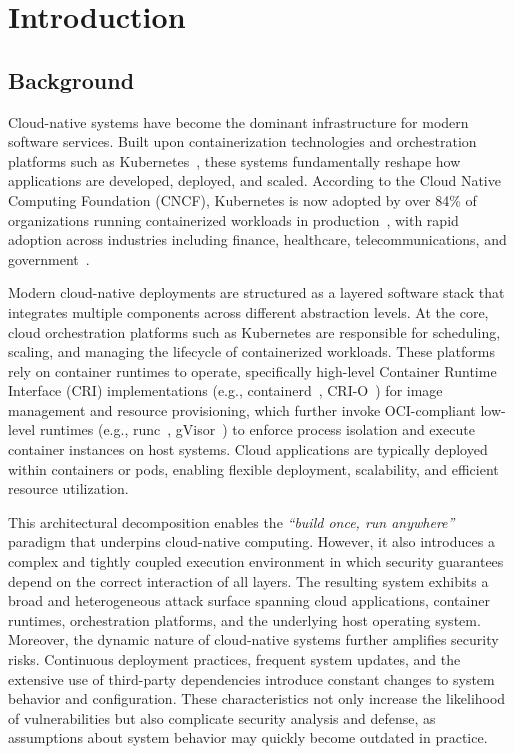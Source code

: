 \chapter{Introduction}

\section{Background}

Cloud-native systems have become the dominant infrastructure for modern software services. Built upon containerization technologies and orchestration platforms such as Kubernetes~\cite{k8s}, these systems fundamentally reshape how applications are developed, deployed, and scaled. According to the Cloud Native Computing Foundation (CNCF), Kubernetes is now adopted by over 84\% of organizations running containerized workloads in production~\cite{cncf2024kubernetes}, with rapid adoption across industries including finance, healthcare, telecommunications, and government~\cite{unyaml2024k8sstats}.

Modern cloud-native deployments are structured as a layered software stack that integrates multiple components across different abstraction levels. At the core, cloud orchestration platforms such as Kubernetes are responsible for scheduling, scaling, and managing the lifecycle of containerized workloads. These platforms rely on container runtimes to operate, specifically high-level Container Runtime Interface (CRI) implementations (e.g., containerd~\cite{containerd}, CRI-O~\cite{crio}) for image management and resource provisioning, which further invoke OCI-compliant low-level runtimes (e.g., runc~\cite{runc}, gVisor~\cite{gvisor}) to enforce process isolation and execute container instances on host systems. Cloud applications are typically deployed within containers or pods, enabling flexible deployment, scalability, and efficient resource utilization.

This architectural decomposition enables the \textit{``build once, run anywhere''} paradigm that underpins cloud-native computing. However, it also introduces a complex and tightly coupled execution environment in which security guarantees depend on the correct interaction of all layers. The resulting system exhibits a broad and heterogeneous attack surface spanning cloud applications, container runtimes, orchestration platforms, and the underlying host operating system. Moreover, the dynamic nature of cloud-native systems further amplifies security risks. Continuous deployment practices, frequent system updates, and the extensive use of third-party dependencies introduce constant changes to system behavior and configuration. These characteristics not only increase the likelihood of vulnerabilities but also complicate security analysis and defense, as assumptions about system behavior may quickly become outdated in practice.

